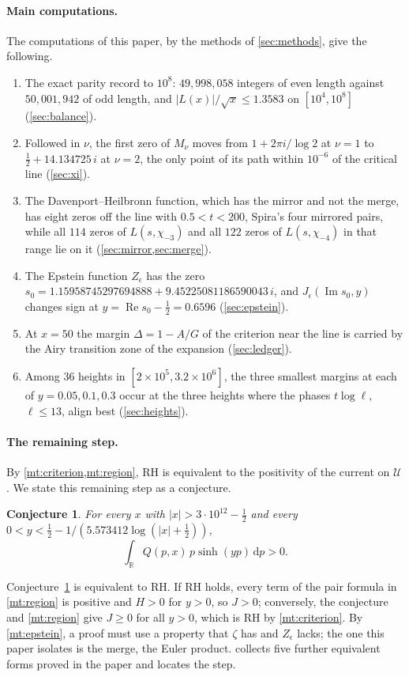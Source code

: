 \documentclass[11pt]{article}
\newtheorem{conjecture}{Conjecture}
\theoremstyle{definition}\newtheorem{definition}[theorem]{Definition}
\theoremstyle{remark}\newtheorem{remark}[theorem]{Remark}
\newcommand{\R}{\mathbb R}\newcommand{\C}{\mathbb C}\newcommand{\N}{\mathbb N}
\newcommand{\dd}{\,\mathrm d}\newcommand{\e}{\mathrm e}
\renewcommand{\Re}{\operatorname{Re}}\renewcommand{\Im}{\operatorname{Im}}
\begin{document}
\paragraph{Main computations.} The computations of this paper, by the methods of \cref{sec:methods}, give the following.
\begin{enumerate}[label=(\arabic*)]
\item The exact parity record to $10^8$: $49{,}998{,}058$ integers of even length against $50{,}001{,}942$ of odd length, and $|L(x)|/\sqrt x\le1.3583$ on $[10^4,10^8]$ (\cref{sec:balance}).
\item Followed in $\nu$, the first zero of $M_\nu$ moves from $1+2\pi i/\log2$ at $\nu=1$ to $\frac12+14.134725\,i$ at $\nu=2$, the only point of its path within $10^{-6}$ of the critical line (\cref{sec:xi}).
\item The Davenport--Heilbronn function, which has the mirror and not the merge, has eight zeros off the line with $0.5<t<200$, Spira's four mirrored pairs, while all $114$ zeros of $L(s,\chi_{-3})$ and all $122$ zeros of $L(s,\chi_{-4})$ in that range lie on it (\cref{sec:mirror,sec:merge}).
\item The Epstein function $Z_\epsilon$ has the zero $s_0=1.15958745297694888+9.45225081186590043\,i$, and $J_\epsilon(\Im s_0,y)$ changes sign at $y=\Re s_0-\frac12=0.6596$ (\cref{sec:epstein}).
\item At $x=50$ the margin $\Delta=1-A/G$ of the criterion near the line is carried by the Airy transition zone of the expansion (\cref{sec:ledger}).
\item Among $36$ heights in $[2\times10^5,3.2\times10^6]$, the three smallest margins at each of $y=0.05,0.1,0.3$ occur at the three heights where the phases $t\log\ell$, $\ell\le13$, align best (\cref{sec:heights}).
\end{enumerate}

\paragraph{The remaining step.} By \cref{mt:criterion,mt:region}, RH is equivalent to the positivity of the current on $\mathcal U$. We state this remaining step as a conjecture.
\begin{conjecture}\label{conj:target}
For every $x$ with $|x|>3\cdot10^{12}-\frac12$ and every $0<y<\frac12-1/(5.573412\log(|x|+\frac12))$,
\[
\int_\R Q(p,x)\,p\sinh(yp)\dd p>0 .
\]
\end{conjecture}
Conjecture~\ref{conj:target} is equivalent to RH. If RH holds, every term of the pair formula in \cref{mt:region} is positive and $H>0$ for $y>0$, so $J>0$; conversely, the conjecture and \cref{mt:region} give $J\ge0$ for all $y>0$, which is RH by \cref{mt:criterion}. By \cref{mt:epstein}, a proof must use a property that $\zeta$ has and $Z_\epsilon$ lacks; the one this paper isolates is the merge, the Euler product.  collects five further equivalent forms proved in the paper and locates the step.
\end{document}
